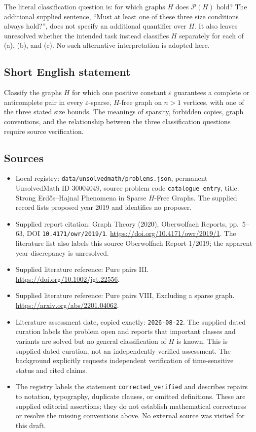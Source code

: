 \documentclass[11pt]{article}
\begin{document}
The literal classification question is: for which graphs \(H\) does \(\mathcal P(H)\) hold? The additional supplied sentence, ``Must at least one of these three size conditions always hold?'', does not specify an additional quantifier over \(H\). It also leaves unresolved whether the intended task instead classifies \(H\) separately for each of (a), (b), and (c). No such alternative interpretation is adopted here.
\subsection{Short English statement}
Classify the graphs \(H\) for which one positive constant \(\varepsilon\) guarantees a complete or anticomplete pair in every \(\varepsilon\)-sparse, \(H\)-free graph on \(n>1\) vertices, with one of the three stated size bounds. The meanings of sparsity, forbidden copies, graph conventions, and the relationship between the three classification questions require source verification.
\subsection{Sources}
\begin{itemize}
\item Local registry: \texttt{data/unsolvedmath/problems.json}, permanent UnsolvedMath ID \(30004049\), source problem code \texttt{catalogue entry}, title: Strong Erdős--Hajnal Phenomena in Sparse \(H\)-Free Graphs. The supplied record lists proposed year 2019 and identifies no proposer.
\item Supplied report citation: Graph Theory (2020), Oberwolfach Reports, pp.~5--63, DOI \texttt{10.4171/owr/2019/1}. \url{https://doi.org/10.4171/owr/2019/1}. The literature list also labels this source Oberwolfach Report 1/2019; the apparent year discrepancy is unresolved.
\item Supplied literature reference: Pure pairs III. \url{https://doi.org/10.1002/jgt.22556}.
\item Supplied literature reference: Pure pairs VIII, Excluding a sparse graph. \url{https://arxiv.org/abs/2201.04062}.
\item Literature assessment date, copied exactly: \texttt{2026-08-22}. The supplied dated curation labels the problem open and reports that important classes and variants are solved but no general classification of \(H\) is known. This is supplied dated curation, not an independently verified assessment. The background explicitly requests independent verification of time-sensitive status and cited claims.
\item The registry labels the statement \texttt{corrected\_verified} and describes repairs to notation, typography, duplicate clauses, or omitted definitions. These are supplied editorial assertions; they do not establish mathematical correctness or resolve the missing conventions above. No external source was visited for this draft.
\end{itemize}
\end{document}
